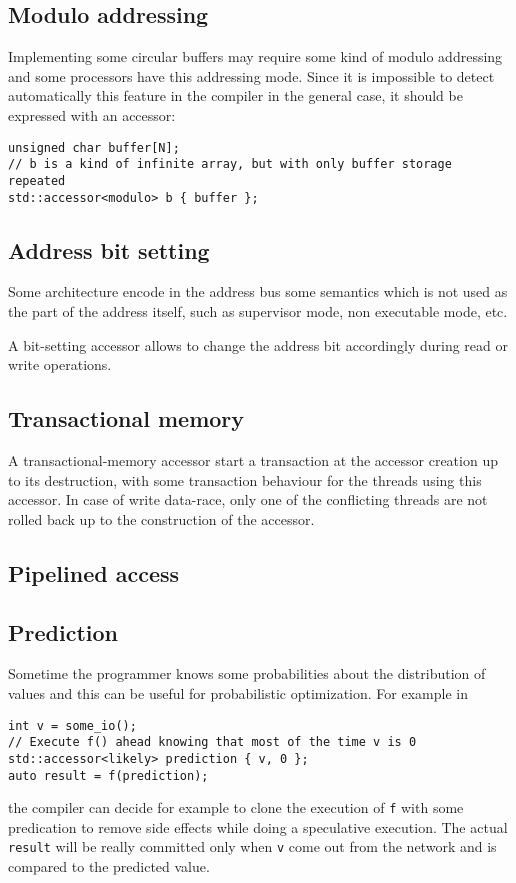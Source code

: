 \documentclass[a4paper]{article}
\begin{document}
\subsection{Modulo addressing}
\label{sec:modulo-addressing}

Implementing some circular buffers may require some kind of modulo
addressing and some processors have this addressing mode. Since it is
impossible to detect automatically this feature in the compiler in the
general case, it should be expressed with an accessor:
\begin{lstlisting}
unsigned char buffer[N];
// b is a kind of infinite array, but with only buffer storage repeated
std::accessor<modulo> b { buffer };
\end{lstlisting}


\subsection{Address bit setting}
\label{sec:address-bit-setting}

Some architecture encode in the address bus some semantics which is
not used as the part of the address itself, such as supervisor mode,
non executable mode, etc.

A bit-setting accessor allows to change the address bit accordingly
during read or write operations.


\subsection{Transactional memory}
\label{sec:transactional-memory}

A transactional-memory accessor start a transaction at the accessor
creation up to its destruction, with some transaction behaviour for
the threads using this accessor. In case of write data-race, only one
of the conflicting threads are not rolled back up to the construction
of the accessor.


\subsection{Pipelined access}
\label{sec:pipelined-access}


\subsection{Prediction}
\label{sec:prediction}

Sometime the programmer knows some probabilities about the
distribution of values and this can be useful for probabilistic
optimization. For example in
\begin{lstlisting}
int v = some_io();
// Execute f() ahead knowing that most of the time v is 0
std::accessor<likely> prediction { v, 0 };
auto result = f(prediction);
\end{lstlisting}
the compiler can decide for example to clone the execution of
\texttt{f} with some predication to remove side effects while doing a
speculative execution. The actual \texttt{result} will be really
committed only when \texttt{v} come out from the network and is
compared to the predicted value.
\end{document}

